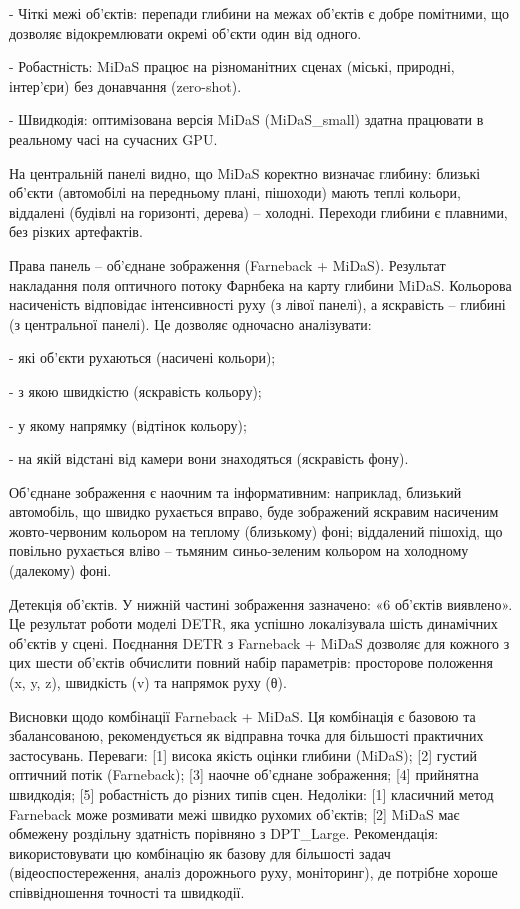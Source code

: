\documentclass[
]{article}
\begin{document}
- Чіткі межі об'єктів: перепади глибини на межах об'єктів є добре помітними, що дозволяє відокремлювати окремі об'єкти один від одного.

- Робастність: MiDaS працює на різноманітних сценах (міські, природні, інтер'єри) без донавчання (zero-shot).

- Швидкодія: оптимізована версія MiDaS (MiDaS\_small) здатна працювати в реальному часі на сучасних GPU.

На центральній панелі видно, що MiDaS коректно визначає глибину: близькі об'єкти (автомобілі на передньому плані, пішоходи) мають теплі кольори, віддалені (будівлі на горизонті, дерева) -- холодні. Переходи глибини є плавними, без різких артефактів.

Права панель -- об'єднане зображення (Farneback + MiDaS). Результат накладання поля оптичного потоку Фарнбека на карту глибини MiDaS. Кольорова насиченість відповідає інтенсивності руху (з лівої панелі), а яскравість -- глибині (з центральної панелі). Це дозволяє одночасно аналізувати:

- які об'єкти рухаються (насичені кольори);

- з якою швидкістю (яскравість кольору);

- у якому напрямку (відтінок кольору);

- на якій відстані від камери вони знаходяться (яскравість фону).

Об'єднане зображення є наочним та інформативним: наприклад, близький автомобіль, що швидко рухається вправо, буде зображений яскравим насиченим жовто-червоним кольором на теплому (близькому) фоні; віддалений пішохід, що повільно рухається вліво -- тьмяним синьо-зеленим кольором на холодному (далекому) фоні.

Детекція об'єктів. У нижній частині зображення зазначено: «6 об'єктів виявлено». Це результат роботи моделі DETR, яка успішно локалізувала шість динамічних об'єктів у сцені. Поєднання DETR з Farneback + MiDaS дозволяє для кожного з цих шести об'єктів обчислити повний набір параметрів: просторове положення (x, y, z), швидкість (v) та напрямок руху (θ).

Висновки щодо комбінації Farneback + MiDaS. Ця комбінація є базовою та збалансованою, рекомендується як відправна точка для більшості практичних застосувань. Переваги: {[}1{]} висока якість оцінки глибини (MiDaS); {[}2{]} густий оптичний потік (Farneback); {[}3{]} наочне об'єднане зображення; {[}4{]} прийнятна швидкодія; {[}5{]} робастність до різних типів сцен. Недоліки: {[}1{]} класичний метод Farneback може розмивати межі швидко рухомих об'єктів; {[}2{]} MiDaS має обмежену роздільну здатність порівняно з DPT\_Large. Рекомендація: використовувати цю комбінацію як базову для більшості задач (відеоспостереження, аналіз дорожнього руху, моніторинг), де потрібне хороше співвідношення точності та швидкодії.
\end{document}
